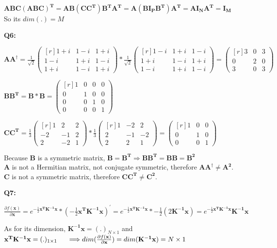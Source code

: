 \documentclass[a4paper,fleqn]{article}
\newcommand{\newvec}[1]{
    \begin{pmatrix*}[r]
        #1
    \end{pmatrix*}
}
\begin{document}
    \vspace{0.5cm}
    \noindent $\mathbf{ABC(ABC)^T}=\mathbf{AB(CC^T)B^TA^T}=\mathbf{A(BI_PB^T)A^T}=\mathbf{AI_NA^T}=\mathbf{I_M}$ \\
    So its $dim(.) = M$

    \newpage
    \Large{\textbf{Q6:}}

    $\mathbf{AA^\dagger}=\frac{1}{\sqrt{2}}\newvec{1+i&1-i&1+i\\1-i&1+i&1-i\\1+i&1-i&1+i}*\frac{1}{\sqrt{2}}\newvec{1-i&1+i&1-i\\1+i&1-i&1+i\\1-i&1+i&1-i}=\newvec{3&0&3\\0&2&0\\3&0&3}$

    $\mathbf{BB^T}=\mathbf{B*B}=\newvec{1&0&0&0\\0&1&0&0\\0&0&1&0\\0&0&0&1}$

    $\mathbf{CC^T}=\frac{1}{3}\newvec{1&2&2\\-2&-1&2\\2&-2&1}*\frac{1}{3}\newvec{1&-2&2\\2&-1&-2\\2&2&1}=\newvec{1&0&0\\0&1&0\\0&0&1}$

    \noindent Because $\mathbf{B}$ is a symmetric matrix, $\mathbf{B}=\mathbf{B^T}\Longrightarrow\mathbf{BB^T}=\mathbf{BB}=\mathbf{B^2}$ \\
    $\mathbf{A}$ is not a Hermitian matrix, not conjugate symmetric, therefore $\mathbf{AA^\dagger \neq A^2}$. \\
    $\mathbf{C}$ is not a symmetric matrix, therefore $\mathbf{CC^T\neq C^2}$.

    \newpage
    \Large{\textbf{Q7:}}

    $\frac{\partial f(\mathbf{x})}{\partial \mathbf{x}} = e^{-\frac{1}{2}\mathbf{x^T K^{-1} x}}
    *(-\frac{1}{2}\mathbf{x^T K^{-1} x})^{'}=e^{-\frac{1}{2}\mathbf{x^T K^{-1} x}}*-\frac{1}{2}(2\mathbf{K^{-1}x})
    =e^{-\frac{1}{2}\mathbf{x^T K^{-1} x}}\mathbf{K^{-1}x} $
    
    \vspace{1cm}
    As for its dimension, $\mathbf{K^{-1}x}=(.)_{N\times 1}$ and $\mathbf{x^T K^{-1} x}=(.)_{1\times 1} \\ 
    \indent\Longrightarrow dim(\frac{\partial f(\mathbf{x})}{\partial \mathbf{x}})=dim(\mathbf{K^{-1}x})=N\times 1$
\end{document}
